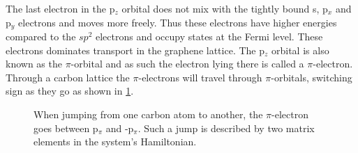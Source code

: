 The last electron in the p\(_z\) orbital does not mix with the tightly bound s, p\(_x\) and p\(_y\) electrons and moves more freely. Thus these electrons have higher energies compared to the \(sp^2\) electrons and occupy states at the Fermi level. These electrons dominates transport in the graphene lattice. The p\(_z\) orbital is also known as the \(\pi\)-orbital and as such the electron lying there is called a \(\pi\)-electron. Through a carbon lattice the \(\pi\)-electrons will travel through \(\pi\)-orbitals, switching sign as they go as shown in \cref{sign}.
\begin{figure}[H]
	\begin{center}
		\caption{When jumping from one carbon atom to another, the \(\pi\)-electron goes between p\(_\pi\) and -p\(_\pi\). Such a jump is described by two matrix elements in the system's Hamiltonian.}
		\label{sign}
	\end{center}
\end{figure}
